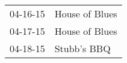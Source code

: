 \begin{supertabular}{p{0.07\textwidth}p{0.23\textwidth}}
 04-16-15 &  House of Blues \\
 04-17-15 &  House of Blues \\
 04-18-15 &     Stubb's BBQ \\
\end{supertabular}
